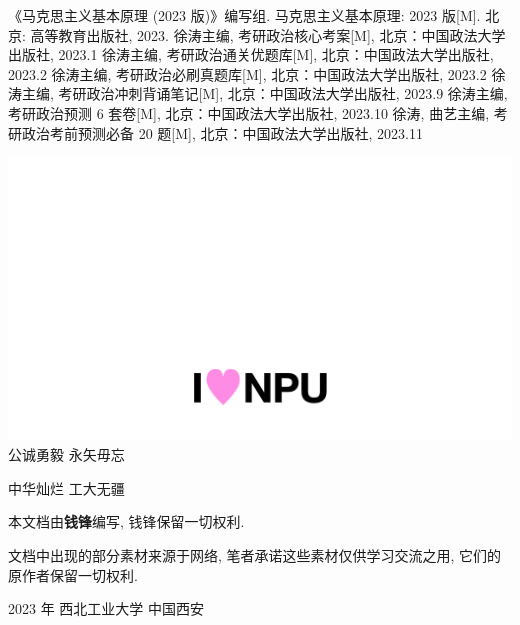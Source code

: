 \documentclass[11pt, UTF8]{book} %
\begin{document}
\newpage
\thispagestyle{empty}
\begin{thebibliography}{1}
    《马克思主义基本原理 (2023 版)》编写组. 马克思主义基本原理: 2023 版[M].
    北京: 高等教育出版社, 2023.
    徐涛主编, 考研政治核心考案[M], 北京：中国政法大学出版社, 2023.1
    徐涛主编, 考研政治通关优题库[M], 北京：中国政法大学出版社, 2023.2
    徐涛主编, 考研政治必刷真题库[M], 北京：中国政法大学出版社, 2023.2
    徐涛主编, 考研政治冲刺背诵笔记[M], 北京：中国政法大学出版社, 2023.9
    徐涛主编, 考研政治预测 6 套卷[M], 北京：中国政法大学出版社, 2023.10
    徐涛, 曲艺主编, 考研政治考前预测必备 20 题[M], 北京：中国政法大学出版社, 2023.11
\end{thebibliography}

\newpage
\thispagestyle{empty}
\vspace*{5cm}
\begin{center}
    \includegraphics*[width=\textwidth]{pic/i_love_npu.jpeg}
    \large
    公诚勇毅 \quad 永矢毋忘

    中华灿烂 \quad 工大无疆
\end{center}
\vspace*{13em}
\begin{center}
    \small
    本文档由\textbf{钱锋}编写, 钱锋保留一切权利.

    文档中出现的部分素材来源于网络, 笔者承诺这些素材仅供学习交流之用, 
    它们的原作者保留一切权利.

    2023 年 \quad 西北工业大学 \quad 中国西安 
\end{center}
\end{document}
